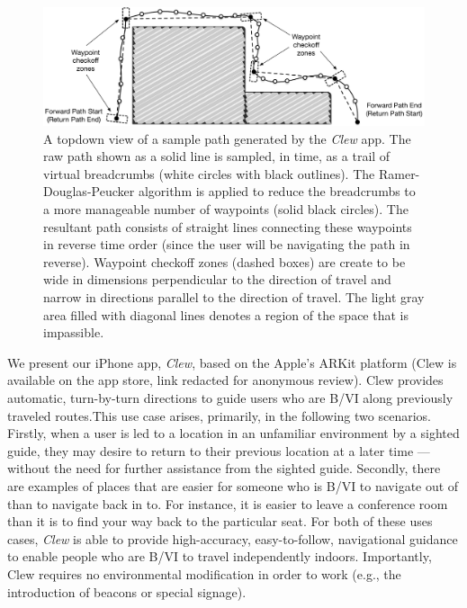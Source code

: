 \documentclass[chi_draft]{sigchi}
\newcommand{\BVI}{B/VI\xspace}
\begin{document}
\begin{figure}
\begin{center}
\includegraphics[width=0.9\linewidth]{Figures/samplepath}
\end{center}
\caption{A topdown view of a sample path generated by the \emph{Clew} app.  The raw path shown as a solid line is sampled, in time, as a trail of virtual breadcrumbs (white circles with black outlines).  The Ramer-Douglas-Peucker algorithm is applied to reduce the breadcrumbs to a more manageable number of waypoints (solid black circles).  The resultant path consists of straight lines connecting these waypoints in reverse time order (since the user will be navigating the path in reverse).  Waypoint checkoff zones (dashed boxes) are create to be wide in dimensions perpendicular to the direction of travel and narrow in directions parallel to the direction of travel.  The light gray area filled with diagonal lines denotes a region of the space that is impassible.\label{fig:samplepath}}
\end{figure}

We present our iPhone app, \emph{Clew}, based on the Apple's ARKit platform (Clew is available on the app store, link redacted for anonymous review).  Clew provides automatic, turn-by-turn directions to guide users who are \BVI along previously traveled routes.This use case arises, primarily, in the following two scenarios.  Firstly, when a user is led to a location in an unfamiliar environment by a sighted guide, they may desire to return to their previous location at a later time --- without the need for further assistance from the sighted guide.  Secondly, there are examples of places that are easier for someone who is \BVI to navigate out of than to navigate back in to.  For instance, it is easier to leave a conference room than it is to find your way back to the particular seat.  For both of these uses cases, \emph{Clew} is able to provide high-accuracy, easy-to-follow, navigational guidance to enable people who are \BVI to travel independently indoors.  Importantly, Clew requires no environmental modification in order to work (e.g., the introduction of beacons or special signage).  
\end{document}
